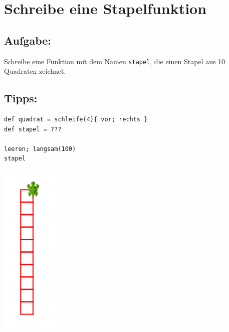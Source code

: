 \chapter{Schreibe eine Stapelfunktion}
\begin{multicols}{2}
\section*{\color{BrickRed}Aufgabe:}
Schreibe eine Funktion mit dem Namen \lstinline{stapel}, die einen Stapel aus 10 Quadraten zeichnet.
\section*{\color{OliveGreen}Tipps:}

\begin{lstlisting}[numbers=none]
def quadrat = schleife(4){ vor; rechts }  
def stapel = ???

leeren; langsam(100)
stapel
\end{lstlisting}
        

\columnbreak

\begin{center}
\includegraphics{../img/square-column.png}
\end{center}

\end{multicols}


